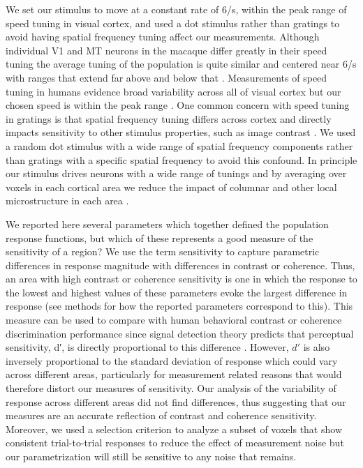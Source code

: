 We set our stimulus to move at a constant rate of 6\degree/s, within the peak range of speed tuning in visual cortex, and used a dot stimulus rather than gratings to avoid having spatial frequency tuning affect our measurements. Although individual V1 and MT neurons in the macaque differ greatly in their speed tuning the average tuning of the population is quite similar and centered near 6\degree/s with ranges that extend far above and below that \citep{Priebe2006-uy}. Measurements of speed tuning in humans evidence broad variability across all of visual cortex but our chosen speed is within the peak range \citep{Singh2000-wr,Hammett2013-fg}. One common concern with speed tuning in gratings is that spatial frequency tuning differs across cortex and directly impacts sensitivity to other stimulus properties, such as image contrast \citep{Priebe2003-ua,Priebe2006-uy}. We used a random dot stimulus with a wide range of spatial frequency components rather than gratings with a specific spatial frequency to avoid this confound. In principle our stimulus drives neurons with a wide range of tunings and by averaging over voxels in each cortical area we reduce the impact of columnar and other local microstructure in each area \citep{Sun2007-cf,Liu2002-hy}.

We reported here several parameters which together defined the population response functions, but which of these represents a good measure of the sensitivity of a region? We use the term sensitivity to capture parametric differences in response magnitude with differences in contrast or coherence. Thus, an area with high contrast or coherence sensitivity is one in which the response to the lowest and highest values of these parameters evoke the largest difference in response (see methods for how the reported parameters correspond to this). This measure can be used to compare with human behavioral contrast or coherence discrimination performance since signal detection theory predicts that perceptual sensitivity, d′, is directly proportional to this difference \citep{Boynton1999-jd,Newsome1989-fr,Pestilli2011-gi,Tolhurst1983-cv,Zenger-Landolt2003-kq}. However, $d′$ is also inversely proportional to the standard deviation of response which could vary across different areas, particularly for measurement related reasons that would therefore distort our measures of sensitivity. Our analysis of the variability of response across different areas did not find differences, thus suggesting that our measures are an accurate reflection of contrast and coherence sensitivity. Moreover, we used a selection criterion to analyze a subset of voxels that show consistent trial-to-trial responses to reduce the effect of measurement noise but our parametrization will still be sensitive to any noise that remains.

